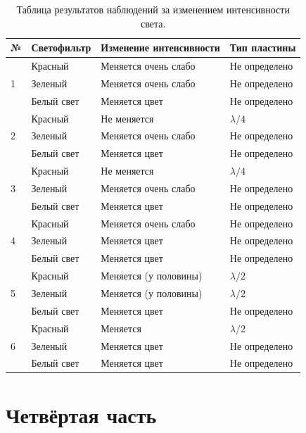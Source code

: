 \documentclass[12pt]{article}
\begin{document}
\begin{table}
\centering
\begin{tabular}{|l|l|l|l|} 
\hline
№                  & Светофильтр   & Изменение
			интенсивности & Тип
			пластины   \\ 
\hline
\multirow{3}{*}{1} & Красный       & Меняется
			очень слабо    & Не
			определено  \\ 
\cline{2-4}
                   & Зеленый       & Меняется
			очень слабо    & Не
			определено  \\ 
\cline{2-4}
                   & Белый
			свет & Меняется
			цвет           & Не
			определено  \\ 
\hline
\multirow{3}{*}{2} & Красный       & Не
			меняется             & $\lambda/4$       \\ 
\cline{2-4}
                   & Зеленый       & Меняется
			очень слабо    & Не
			определено  \\ 
\cline{2-4}
                   & Белый
			свет & Меняется
			цвет           & Не
			определено  \\ 
\hline
\multirow{3}{*}{3} & Красный       & Не
			меняется             & $\lambda/4$       \\ 
\cline{2-4}
                   & Зеленый       & Меняется
			очень слабо    & Не
			определено  \\ 
\cline{2-4}
                   & Белый
			свет & Меняется
			цвет           & Не
			определено  \\ 
\hline
\multirow{3}{*}{4} & Красный       & Меняется
			очень слабо    & Не
			определено  \\ 
\cline{2-4}
                   & Зеленый       & Меняется
			цвет           & Не
			определено  \\ 
\cline{2-4}
                   & Белый
			свет & Меняется
			цвет           & Не
			определено  \\ 
\hline
\multirow{3}{*}{5} & Красный       & Меняется
			(у половины)   & $\lambda/2$       \\ 
\cline{2-4}
                   & Зеленый       & Меняется
			(у половины)   & $\lambda/2$       \\ 
\cline{2-4}
                   & Белый
			свет & Меняется
			цвет           & Не
			определено  \\ 
\hline
\multirow{3}{*}{6} & Красный       & Меняется                   & $\lambda/2$       \\ 
\cline{2-4}
                   & Зеленый       & Меняется
			цвет           & Не
			определено  \\ 
\cline{2-4}
                   & Белый
			свет & Меняется
			цвет           & Не
			определено  \\
\hline
\end{tabular}
\caption{Таблица результатов наблюдений за изменением интенсивности света.}
\label{tab:1}
\end{table}
	
	\section{Четвёртая часть}
\end{document}
